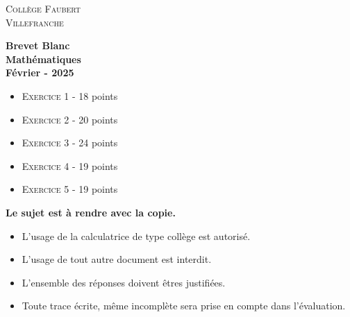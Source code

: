 






\begin{titlepage}

    \center %
    
    \textsc{\LARGE Collège Faubert}\\[2cm] %
    \textsc{\large Villefranche}\\[2cm] %
    
    \horrule{2px}
    
    \vspace{1cm}
    
    { \Huge \bfseries Brevet Blanc}\\[2cm] %
    { \Huge \bfseries Mathématiques}\\[2cm] %
    {\large \bfseries Février - 2025}\\[2cm] 
    
    \horrule{2px}
    
    \vspace{1cm}
    
    \begin{itemize}[label={$\bullet$}]
      \item \textsc{Exercice 1} - 18 points     
      \item \textsc{Exercice 2} - 20 points 
      \item \textsc{Exercice 3} - 24 points
      \item \textsc{Exercice 4} - 19 points 
      \item \textsc{Exercice 5} - 19 points  
    \end{itemize}
    
    \vspace{1cm}
    
    \horrule{2px}
    
    \vspace{1cm}
    
    \textbf{Le sujet est à rendre avec la copie.}
    
    \vspace{1cm}
    
    \begin{itemize}
      \item L'usage de la calculatrice de type collège est autorisé.
      \item L'usage de tout autre document est interdit. 
      \item L'ensemble des réponses doivent êtres justifiées.
      \item Toute trace écrite, même incomplète sera prise en compte dans l'évaluation.
    \end{itemize}
    
    \vfill 
    
    \end{titlepage}
    

